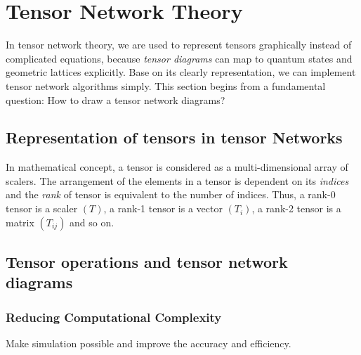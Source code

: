 \chapter{Tensor Network Theory}
In tensor network theory, we are used to represent tensors graphically instead of complicated equations, because \textit{tensor diagrams} can map to quantum states and geometric lattices explicitly. Base on its clearly representation, we can implement tensor network algorithms simply. This section begins from a fundamental question: How to draw a tensor network diagrams?

\section{Representation of tensors in tensor Networks}
\label{notations}
In mathematical concept, a tensor is considered as a multi-dimensional array of scalers. The arrangement of the elements in a tensor is dependent on its \textit{indices} and the \textit{rank} of tensor is equivalent to the number of indices. Thus, a rank-0 tensor is a scaler $(T)$, a rank-1 tensor is a vector $(T_{i})$, a rank-2 tensor is a matrix $(T_{ij})$ and so on.



\section{Tensor operations and tensor network diagrams} %
\label{operation}

\subsection{Reducing Computational Complexity} %
\label{sub:reduce}

Make simulation possible and improve the accuracy and efficiency.
